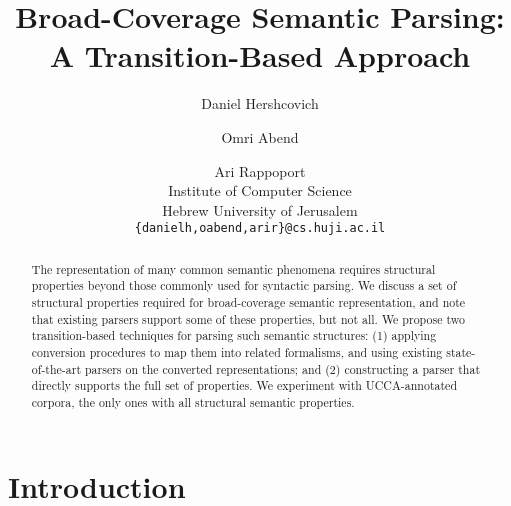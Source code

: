 \documentclass[11pt]{article}
\title{Broad-Coverage Semantic Parsing: A Transition-Based Approach}
\author{Daniel Hershcovich \and Omri Abend \and Ari Rappoport \\
  Institute of Computer Science \\
  Hebrew University of Jerusalem \\
  {\tt \{danielh,oabend,arir\}@cs.huji.ac.il}
}
\date{}
\begin{document}
\maketitle

\begin{abstract}

  The representation of many common semantic phenomena requires 
  structural properties beyond those commonly used for syntactic parsing.
  We discuss a set of structural properties required for
  broad-coverage semantic representation, and note that existing
  parsers support some of these properties, but not all.
  We propose two transition-based techniques for parsing such semantic structures:
  (1) applying conversion procedures to map them into related formalisms,
  and using existing state-of-the-art parsers on the converted representations;
  and (2) constructing a parser that directly supports the full set of properties.
  We experiment with UCCA-annotated corpora, the only ones with all
  structural semantic properties.
  
\end{abstract}



\section{Introduction}
\end{document}
